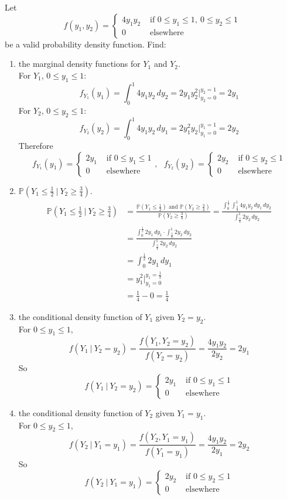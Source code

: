 \documentclass[12pt]{article}
\newcommand{\ques}[1]{\noindent {\bf Question #1: }}
\newcommand{\prob}[1]{\mathbb{P}(#1)}
\newcommand{\cprob}[2]{\mathbb{P}\left(#1 ~|~ #2\right)}
\begin{document}
\ques{5.26} Let $$f(y_1, y_2) = \begin{cases} 4y_1y_2 &\text{ if } 0 \leq y_1 \leq 1, ~ 0 \leq y_2 \leq 1 \\ 0 &\text{ elsewhere } \end{cases} $$ be a valid probability density function. Find: 
\begin{enumerate} 
\item the marginal density functions for $Y_1$ and $Y_2$. \\
For $Y_1$, $0 \leq y_1 \leq 1$: $$ f_{Y_1}(y_1) = \int_0^1 4y_1y_2 \, dy_2 = 2y_1y_2^2\Big|_{y_2 = 0}^{y_2 = 1} = 2y_1 $$ 
For $Y_2$, $0 \leq y_2 \leq 1$: $$ f_{Y_2}(y_2) = \int_0^1 4y_1y_2 \, dy_1 = 2y_1^2y_2\Big|_{y_1 = 0}^{y_1 = 1} = 2y_2 $$ 
Therefore $$ f_{Y_1}(y_1) = \begin{cases} 2y_1 &\text{ if } 0 \leq y_1 \leq 1 \\ 0 &\text{ elsewhere } \end{cases}, ~~~
f_{Y_2}(y_2) = \begin{cases} 2y_2 &\text{ if } 0 \leq y_2 \leq 1 \\ 0 &\text{ elsewhere } \end{cases} $$ 

\item $\cprob{Y_1 \leq \frac{1}{2}}{Y_2 \geq \frac{3}{4}}$. 
$$ \begin{aligned}
\cprob{Y_1 \leq \frac{1}{2}}{Y_2 \geq \frac{3}{4}} &= \frac{\prob{Y_1 \leq \frac{1}{2}} \text{ and } \prob{Y_2 \geq \frac{3}{4}}}{\prob{Y_2 \geq \frac{3}{4}}} = \frac{\int_0^{\frac{1}{2}} \int_{\frac{3}{4}}^1 4y_1y_2 \, dy_1\, dy_2}{\int_{\frac{3}{4}}^1 2y_2 \, dy_2} \\ &= \frac{\int_0^{\frac{1}{2}} 2y_1 \, dy_1 \cdot \int_{\frac{3}{4}}^1 2y_2 \, dy_2}{\int_{\frac{3}{4}}^1 2y_2 \, dy_2} \\ &= \int_0^{\frac{1}{2}} 2y_1 \, dy_1 \\ &= y_1^2\Big|_{y_1 = 0}^{y_1 = \frac{1}{2}} \\ &= \frac{1}{4} - 0 = \frac{1}{4} \end{aligned} $$ 

\item the conditional density function of $Y_1$ given $Y_2 = y_2$. \\
For $0 \leq y_1 \leq 1$,
$$ f(Y_1~|~Y_2 = y_2) = \frac{f(Y_1, Y_2 = y_2)}{f(Y_2 = y_2)} = \frac{4y_1y_2}{2y_2} = 2y_1 $$
So $$ f(Y_1 ~|~ Y_2 = y_2) = \begin{cases} 2y_1 &\text{ if } 0 \leq y_1 \leq 1 \\ 0 &\text{ elsewhere } \end{cases} $$ 
\item the conditional density function of $Y_2$ given $Y_1 = y_1$. \\
For $0 \leq y_2 \leq 1$, 
$$ f(Y_2 ~|~ Y_1 = y_1) = \frac{f(Y_2, Y_1 = y_1)}{f(Y_1 = y_1)} = \frac{4y_1y_2}{2y_1} = 2y_2 $$ 
So $$ f(Y_2 ~|~ Y_1 = y_1) = \begin{cases} 2y_2 &\text{ if } 0 \leq y_2 \leq 1 \\ 0 &\text{ elsewhere } \end{cases} $$ 


\end{enumerate}
\end{document}
